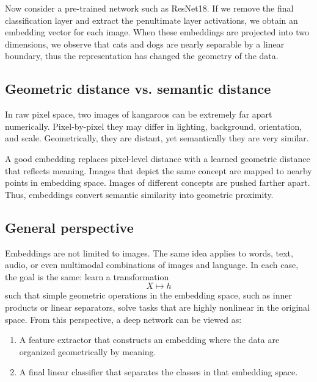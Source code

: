 Now consider a pre-trained network such as ResNet18.  
If we remove the final classification layer and extract the penultimate layer activations, we obtain an embedding vector for each image. When these embeddings are projected into two dimensions, we observe that cats and dogs are nearly separable by a linear boundary, thus the representation has changed the geometry of the data.

\bigskip

\subsection{Geometric distance vs. semantic distance}

\medskip

In raw pixel space, two images of kangaroos can be extremely far apart numerically. Pixel-by-pixel they may differ in lighting, background, orientation, and scale. Geometrically, they are distant, yet semantically they are very similar.

A good embedding replaces pixel-level distance with a learned geometric distance that reflects meaning. Images that depict the same concept are mapped to nearby points in embedding space. Images of different concepts are pushed farther apart. Thus, embeddings convert semantic similarity into geometric proximity.

\bigskip

\subsection{General perspective}

\medskip

Embeddings are not limited to images. The same idea applies to words, text, audio, or even multimodal combinations of images and language. In each case, the goal is the same: learn a transformation
\[
X \mapsto h
\]
such that simple geometric operations in the embedding space, such as inner products or linear separators, solve tasks that are highly nonlinear in the original space. From this perspective, a deep network can be viewed as:

\begin{enumerate}
\item A feature extractor that constructs an embedding where the data are organized geometrically by meaning.
\item A final linear classifier that separates the classes in that embedding space.
\end{enumerate}

